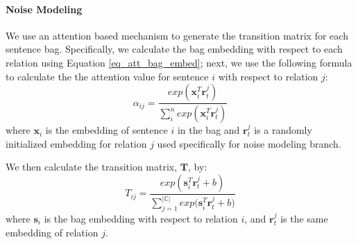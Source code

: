 \paragraph{Noise Modeling}
We use an attention based mechanism to generate the transition matrix %
for each sentence bag. 
Specifically, we calculate the bag embedding with respect to each relation using Equation \ref{eq_att_bag_embed}; next, we use the following formula to calculate the the attention value for sentence $i$ with respect to relation $j$:
\begin{equation}
\alpha_{ij} = \frac{exp(\mathbf{x}_i^T \mathbf{r}_t^j)}{\sum_i^n{exp(\mathbf{x}_i^T \mathbf{r}_t^j)}}
\end{equation}
where $\mathbf{x}_i$ is the embedding of sentence $i$ in the bag and $\mathbf{r}_t^j$ is a randomly initialized embedding for relation $j$ used specifically for noise modeling branch.


We then calculate the transition matrix, $\mathbf{T}$, by:
\begin{equation}
T_{ij} = \frac{exp({\mathbf{s}_i^T \mathbf{r}_t^j  + b})}{\sum_{j=1}^{|\mathbb{C}|}{exp(\mathbf{s}_i^T \mathbf{r}_t^j + b})}
\end{equation}
where $\mathbf{s}_i$ is the bag embedding with respect to relation $i$, and $\mathbf{r}_t^j$ is the same embedding of relation $j$.


